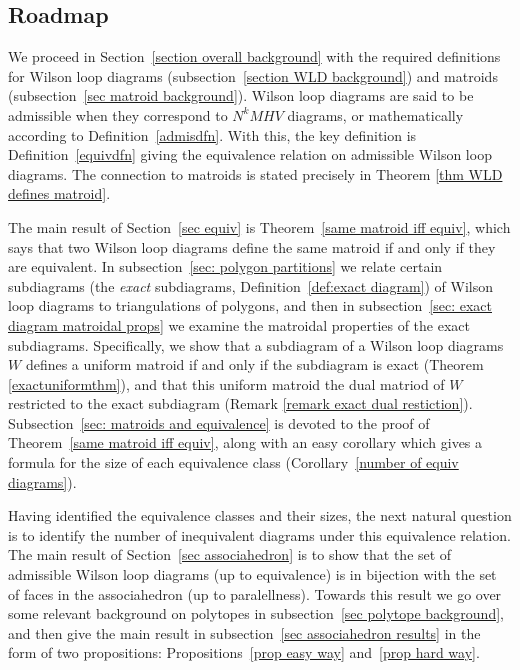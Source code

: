 \documentclass[11pt]{article}
\newcommand{\hlfix}[2]{\texthl{#1}\todo{#2}}
\theoremstyle{remark}
\theoremstyle{definition}
\begin{document}
\subsection{Roadmap}

We proceed in Section~\ref{section overall background} with the required definitions for Wilson loop diagrams (subsection~\ref{section WLD background}) and matroids (subsection~\ref{sec matroid background}).  Wilson loop diagrams  are said to be admissible when they correspond to $N^kMHV$ diagrams, or mathematically according to Definition~\ref{admisdfn}.  With this, the key definition is Definition~\ref{equivdfn} giving the equivalence relation on admissible Wilson loop diagrams.  The connection to matroids is stated precisely in Theorem \ref{thm WLD defines matroid}.

The main result of Section~\ref{sec equiv} is Theorem~\ref{same matroid iff equiv}, which says that two Wilson loop diagrams define the same matroid if and only if they are equivalent.  In subsection~\ref{sec: polygon partitions} we relate certain subdiagrams (the {\em exact} subdiagrams, Definition~\ref{def:exact diagram}) of Wilson loop diagrams to triangulations of polygons, and then in subsection~\ref{sec: exact diagram matroidal props} we examine the matroidal properties of the exact subdiagrams.  Specifically, we show that a subdiagram of a Wilson loop diagrams $W$ defines a uniform matroid if and only if the subdiagram is exact (Theorem \ref{exactuniformthm}), and that this uniform matroid \hlfix{is isomorphic to}{isomorphic or equal?} the dual matriod of $W$ restricted to the exact subdiagram (Remark \ref{remark exact dual restiction}).  Subsection~\ref{sec: matroids and equivalence} is devoted to the proof of Theorem~\ref{same matroid iff equiv}, along with an easy corollary which gives a formula for the size of each equivalence class (Corollary~\ref{number of equiv diagrams}).

Having identified the equivalence classes and their sizes, the next natural question is to identify the number of inequivalent diagrams under this equivalence relation.  The main result of Section~\ref{sec associahedron} is to show that the set of admissible Wilson loop diagrams (up to equivalence) is in bijection with the set of faces in the associahedron (up to paralellness).  Towards this result we go over some relevant background on polytopes in subsection~\ref{sec polytope background}, and then give the main result in subsection~\ref{sec associahedron results} in the form of two propositions: Propositions~\ref{prop easy way} and~\ref{prop hard way}.
\end{document}
